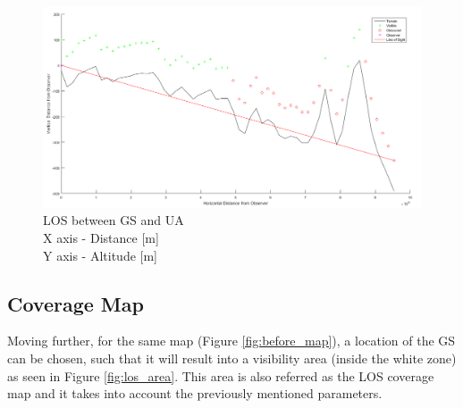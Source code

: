 \begin{figure}[h]
	\centering
	\includegraphics[scale=0.40]{figures/los_2points.png}
	\caption{LOS between GS and UA \\ X axis - Distance [m] \\ Y axis - Altitude [m]}
   	\label{fig:los_2p}
\end{figure}

\subsection{Coverage Map}
Moving further, for the same map (Figure \ref{fig:before_map}), a location of the GS can be chosen, such that it will result into a visibility area (inside the white zone) as seen in Figure \ref{fig:los_area}. This area is also referred as the LOS coverage map and it takes into account the previously mentioned parameters.

